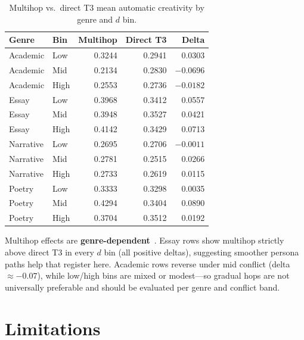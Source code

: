 \documentclass[sigconf,nonacm]{acmart}
\begin{document}
\begin{table}[t]
\centering
\small
\begin{tabular}{llrrr}
\toprule
Genre & Bin & Multihop & Direct T3 & Delta \\
\midrule
Academic & Low & 0.3244 & 0.2941 & 0.0303 \\
Academic & Mid & 0.2134 & 0.2830 & $-0.0696$ \\
Academic & High & 0.2553 & 0.2736 & $-0.0182$ \\
Essay & Low & 0.3968 & 0.3412 & 0.0557 \\
Essay & Mid & 0.3948 & 0.3527 & 0.0421 \\
Essay & High & 0.4142 & 0.3429 & 0.0713 \\
Narrative & Low & 0.2695 & 0.2706 & $-0.0011$ \\
Narrative & Mid & 0.2781 & 0.2515 & 0.0266 \\
Narrative & High & 0.2733 & 0.2619 & 0.0115 \\
Poetry & Low & 0.3333 & 0.3298 & 0.0035 \\
Poetry & Mid & 0.4294 & 0.3404 & 0.0890 \\
Poetry & High & 0.3704 & 0.3512 & 0.0192 \\
\bottomrule
\end{tabular}
\caption{Multihop vs.\ direct T3 mean automatic creativity by genre and $d$ bin.}
\label{tab:multihop}
\end{table}

Multihop effects are \textbf{genre-dependent}~\cite{simonton1999}. Essay rows show multihop strictly above direct T3 in every $d$ bin (all positive deltas), suggesting smoother persona paths help that register here. Academic rows reverse under mid conflict (delta ${\approx}{-}0.07$), while low/high bins are mixed or modest---so gradual hops are not universally preferable and should be evaluated per genre and conflict band.

\section{Limitations}
\end{document}
